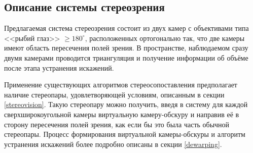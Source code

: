 \subsection{Описание системы стереозрения}

Предлагаемая система стереозрения состоит из двух камер с объективами типа <<рыбий глаз>> $\geqslant180^\circ$,
расположенных ортогонально так, что  две камеры имеют область пересечения полей зрения. В пространстве, наблюдаемом 
сразу  двумя камерами проводится триангуляция и получение информации об объёме после этапа устранения искажений.  %

 


Применение существующих алгоритмов стереосопоставления предполагает наличие стереопары, удовлетворяющей условиям, описанным в секции \ref{stereovision}.
Такую стереопару можно получить, введя в систему  для каждой сверхширокоугольной камеры виртуальную камеру-обскуру и направив 
её в сторону пересечения полей зрения, как если бы это была часть обычной стереопары. Процесс формирования виртуальной камеры-обскуры и 
алгоритм устранения искажений более подробно описаны в секции \ref{dewarping}.

